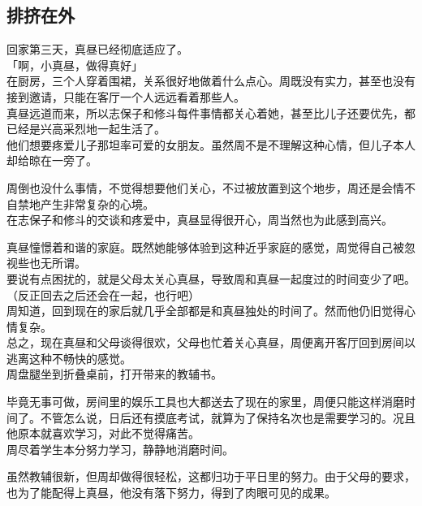 \subsection{排挤在外}

回家第三天，真昼已经彻底适应了。\\

「啊，小真昼，做得真好」\\

在厨房，三个人穿着围裙，关系很好地做着什么点心。周既没有实力，甚至也没有接到邀请，只能在客厅一个人远远看着那些人。\\

真昼远道而来，所以志保子和修斗每件事情都关心着她，甚至比儿子还要优先，都已经是兴高采烈地一起生活了。\\

他们想要疼爱儿子那坦率可爱的女朋友。虽然周不是不理解这种心情，但儿子本人却给晾在一旁了。

周倒也没什么事情，不觉得想要他们关心，不过被放置到这个地步，周还是会情不自禁地产生非常复杂的心境。\\

在志保子和修斗的交谈和疼爱中，真昼显得很开心，周当然也为此感到高兴。

真昼憧憬着和谐的家庭。既然她能够体验到这种近乎家庭的感觉，周觉得自己被忽视些也无所谓。\\

要说有点困扰的，就是父母太关心真昼，导致周和真昼一起度过的时间变少了吧。\\

（反正回去之后还会在一起，也行吧）\\

周知道，回到现在的家后就几乎全部都是和真昼独处的时间了。然而他仍旧觉得心情复杂。\\

总之，现在真昼和父母谈得很欢，父母也忙着关心真昼，周便离开客厅回到房间以逃离这种不畅快的感觉。\\

周盘腿坐到折叠桌前，打开带来的教辅书。

毕竟无事可做，房间里的娱乐工具也大都送去了现在的家里，周便只能这样消磨时间了。不管怎么说，日后还有摸底考试，就算为了保持名次也是需要学习的。况且他原本就喜欢学习，对此不觉得痛苦。\\

周尽着学生本分努力学习，静静地消磨时间。

虽然教辅很新，但周却做得很轻松，这都归功于平日里的努力。由于父母的要求，也为了能配得上真昼，他没有落下努力，得到了肉眼可见的成果。\\

